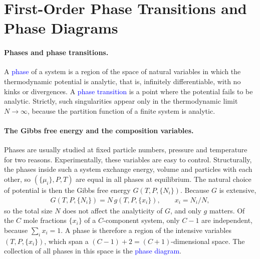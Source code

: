 \section{First-Order Phase Transitions and Phase Diagrams}

\paragraph{Phases and phase transitions.}
A \textcolor{blue}{phase} of a system is a region of the space of natural
variables in which the thermodynamic potential is analytic, that is,
infinitely differentiable, with no kinks or divergences. A
\textcolor{blue}{phase transition} is a point where the potential fails to
be analytic. Strictly, such singularities appear only in the thermodynamic
limit $N\to\infty$, because the partition function of a finite system is
analytic.

\paragraph{The Gibbs free energy and the composition variables.}
Phases are usually studied at fixed particle numbers, pressure and
temperature for two reasons. Experimentally, these variables are easy to
control. Structurally, the phases inside such a system exchange energy,
volume and particles with each other, so $(\{\mu_i\},P,T)$ are equal in all
phases at equilibrium. The natural choice of potential is then the Gibbs
free energy $G(T,P,\{N_i\})$. Because $G$ is extensive,
\begin{align*}
    G(T,P,\{N_i\}) = N\,g(T,P,\{x_i\}), \qquad x_i = N_i/N,
\end{align*}
so the total size $N$ does not affect the analyticity of $G$, and only $g$
matters. Of the $C$ mole fractions $\{x_i\}$ of a $C$-component system, only
$C-1$ are independent, because $\sum_i x_i=1$. A phase is therefore a region
of the intensive variables $(T,P,\{x_i\})$, which span a
$(C-1)+2=(C+1)$-dimensional space. The collection of all phases in this
space is the \textcolor{blue}{phase diagram}.

